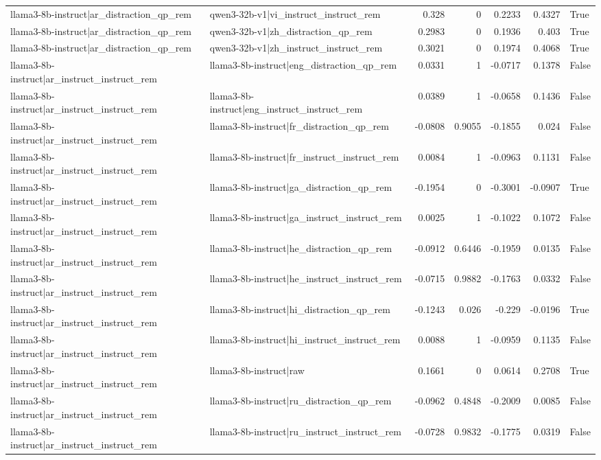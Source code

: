\begin{table}
\begin{tabular}{l l r r r r l}
llama3-8b-instruct|ar_distraction_qp_rem & qwen3-32b-v1|vi_instruct_instruct_rem & 0.328 & 0 & 0.2233 & 0.4327 & True \\
llama3-8b-instruct|ar_distraction_qp_rem & qwen3-32b-v1|zh_distraction_qp_rem & 0.2983 & 0 & 0.1936 & 0.403 & True \\
llama3-8b-instruct|ar_distraction_qp_rem & qwen3-32b-v1|zh_instruct_instruct_rem & 0.3021 & 0 & 0.1974 & 0.4068 & True \\
llama3-8b-instruct|ar_instruct_instruct_rem & llama3-8b-instruct|eng_distraction_qp_rem & 0.0331 & 1 & -0.0717 & 0.1378 & False \\
llama3-8b-instruct|ar_instruct_instruct_rem & llama3-8b-instruct|eng_instruct_instruct_rem & 0.0389 & 1 & -0.0658 & 0.1436 & False \\
llama3-8b-instruct|ar_instruct_instruct_rem & llama3-8b-instruct|fr_distraction_qp_rem & -0.0808 & 0.9055 & -0.1855 & 0.024 & False \\
llama3-8b-instruct|ar_instruct_instruct_rem & llama3-8b-instruct|fr_instruct_instruct_rem & 0.0084 & 1 & -0.0963 & 0.1131 & False \\
llama3-8b-instruct|ar_instruct_instruct_rem & llama3-8b-instruct|ga_distraction_qp_rem & -0.1954 & 0 & -0.3001 & -0.0907 & True \\
llama3-8b-instruct|ar_instruct_instruct_rem & llama3-8b-instruct|ga_instruct_instruct_rem & 0.0025 & 1 & -0.1022 & 0.1072 & False \\
llama3-8b-instruct|ar_instruct_instruct_rem & llama3-8b-instruct|he_distraction_qp_rem & -0.0912 & 0.6446 & -0.1959 & 0.0135 & False \\
llama3-8b-instruct|ar_instruct_instruct_rem & llama3-8b-instruct|he_instruct_instruct_rem & -0.0715 & 0.9882 & -0.1763 & 0.0332 & False \\
llama3-8b-instruct|ar_instruct_instruct_rem & llama3-8b-instruct|hi_distraction_qp_rem & -0.1243 & 0.026 & -0.229 & -0.0196 & True \\
llama3-8b-instruct|ar_instruct_instruct_rem & llama3-8b-instruct|hi_instruct_instruct_rem & 0.0088 & 1 & -0.0959 & 0.1135 & False \\
llama3-8b-instruct|ar_instruct_instruct_rem & llama3-8b-instruct|raw & 0.1661 & 0 & 0.0614 & 0.2708 & True \\
llama3-8b-instruct|ar_instruct_instruct_rem & llama3-8b-instruct|ru_distraction_qp_rem & -0.0962 & 0.4848 & -0.2009 & 0.0085 & False \\
llama3-8b-instruct|ar_instruct_instruct_rem & llama3-8b-instruct|ru_instruct_instruct_rem & -0.0728 & 0.9832 & -0.1775 & 0.0319 & False \\

\end{tabular}
\end{table}

